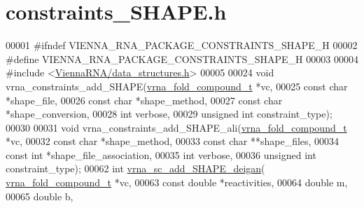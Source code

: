 \hypertarget{constraints__SHAPE_8h_source}{}\section{constraints\+\_\+\+S\+H\+A\+P\+E.\+h}
\label{constraints__SHAPE_8h_source}

\begin{DoxyCode}
00001 \textcolor{preprocessor}{#ifndef VIENNA\_RNA\_PACKAGE\_CONSTRAINTS\_SHAPE\_H}
00002 \textcolor{preprocessor}{#define VIENNA\_RNA\_PACKAGE\_CONSTRAINTS\_SHAPE\_H}
00003 
00004 \textcolor{preprocessor}{#include <\hyperlink{data__structures_8h}{ViennaRNA/data\_structures.h}>}
00005 
00024 \textcolor{keywordtype}{void} vrna\_constraints\_add\_SHAPE(\hyperlink{group__fold__compound_structvrna__fc__s}{vrna\_fold\_compound\_t} *vc,
00025                                 \textcolor{keyword}{const} \textcolor{keywordtype}{char} *shape\_file,
00026                                 \textcolor{keyword}{const} \textcolor{keywordtype}{char} *shape\_method,
00027                                 \textcolor{keyword}{const} \textcolor{keywordtype}{char} *shape\_conversion,
00028                                 \textcolor{keywordtype}{int} verbose,
00029                                 \textcolor{keywordtype}{unsigned} \textcolor{keywordtype}{int} constraint\_type);
00030 
00031 \textcolor{keywordtype}{void} vrna\_constraints\_add\_SHAPE\_ali(\hyperlink{group__fold__compound_structvrna__fc__s}{vrna\_fold\_compound\_t} *vc,
00032                                     \textcolor{keyword}{const} \textcolor{keywordtype}{char} *shape\_method,
00033                                     \textcolor{keyword}{const} \textcolor{keywordtype}{char} **shape\_files,
00034                                     \textcolor{keyword}{const} \textcolor{keywordtype}{int}  *shape\_file\_association,
00035                                     \textcolor{keywordtype}{int} verbose,
00036                                     \textcolor{keywordtype}{unsigned} \textcolor{keywordtype}{int} constraint\_type);
00062 \textcolor{keywordtype}{int} \hyperlink{group__SHAPE__reactivities_ga57d612b58e1c61dd6cfcb5a843f8f1b3}{vrna\_sc\_add\_SHAPE\_deigan}( \hyperlink{group__fold__compound_structvrna__fc__s}{vrna\_fold\_compound\_t} *vc,
00063                               \textcolor{keyword}{const} \textcolor{keywordtype}{double} *reactivities,
00064                               \textcolor{keywordtype}{double} m,
00065                               \textcolor{keywordtype}{double} b,

\end{DoxyCode}
